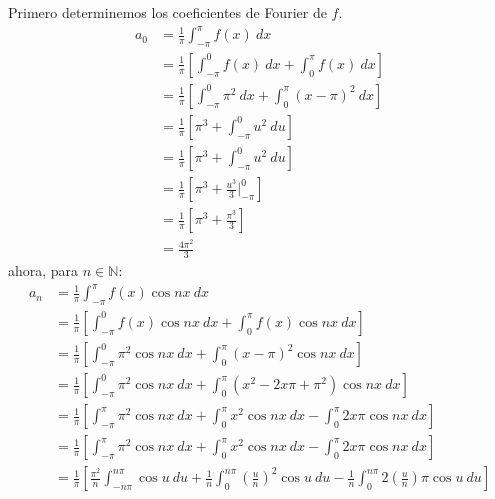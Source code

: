 \documentclass[12pt]{report}
\theoremstyle{largebreak}
\begin{document}
    \begin{sol}
        Primero determinemos los coeficientes de Fourier de $f$.
        \begin{equation*}
            \begin{split}
                a_0&=\frac{1}{\pi}\int_{ -\pi}^\pi f(x)\:dx\\
                &=\frac{1}{\pi}\left[\int_{ -\pi}^0 f(x)\:dx+\int_{0}^\pi f(x)\:dx\right] \\
                &=\frac{1}{\pi}\left[\int_{ -\pi}^0 \pi^2\:dx+\int_{0}^\pi (x-\pi)^2\:dx\right] \\
                &=\frac{1}{\pi}\left[\pi^3+\int_{-\pi}^0 u^2\:du\right] \\
                &=\frac{1}{\pi}\left[\pi^3+\int_{-\pi}^0 u^2\:du\right] \\
                &=\frac{1}{\pi}\left[\pi^3+ \frac{u^3}{3}\Big|_{-\pi}^0 \right] \\
                &=\frac{1}{\pi}\left[\pi^3+\frac{\pi^3}{3}\right] \\
                &=\frac{4\pi^2}{3}
            \end{split}
        \end{equation*}
        ahora, para $n\in\mathbb{N}$:
        \begin{equation*}
            \begin{split}
                a_n&=\frac{1}{\pi}\int_{ -\pi}^{\pi}f(x)\cos nx\:dx\\
                &=\frac{1}{\pi}\left[\int_{ -\pi}^{0}f(x)\cos nx\:dx+\int_{0}^{\pi}f(x)\cos nx\:dx\right] \\
                &=\frac{1}{\pi}\left[\int_{ -\pi}^{0}\pi^2\cos nx\:dx+\int_{0}^{\pi}(x-\pi)^2\cos nx\:dx\right]\\
                &=\frac{1}{\pi}\left[\int_{ -\pi}^{0}\pi^2\cos nx\:dx+\int_{0}^{\pi}(x^2-2x\pi+\pi^2)\cos nx\:dx\right]\\
                &=\frac{1}{\pi}\left[\int_{ -\pi}^{\pi}\pi^2\cos nx\:dx+\int_{0}^{\pi}x^2\cos nx\:dx-\int_{0}^{\pi}2x\pi\cos nx\:dx\right]\\
                &=\frac{1}{\pi}\left[\int_{ -\pi}^{\pi}\pi^2\cos nx\:dx+\int_{0}^{\pi}x^2\cos nx\:dx-\int_{0}^{\pi}2x\pi\cos nx\:dx\right]\\
                &=\frac{1}{\pi}\left[\frac{\pi^2}{n}\int_{ -n\pi}^{n\pi}\cos u\:du+\frac{1}{n}\int_{0}^{n\pi}\left(\frac{u}{n}\right)^2 \cos u\:du-\frac{1}{n}\int_{0}^{n\pi}2\left(\frac{u}{n}\right)\pi\cos u\:du\right]\\

\end{split}
\end{equation*}
\end{sol}
\end{document}
